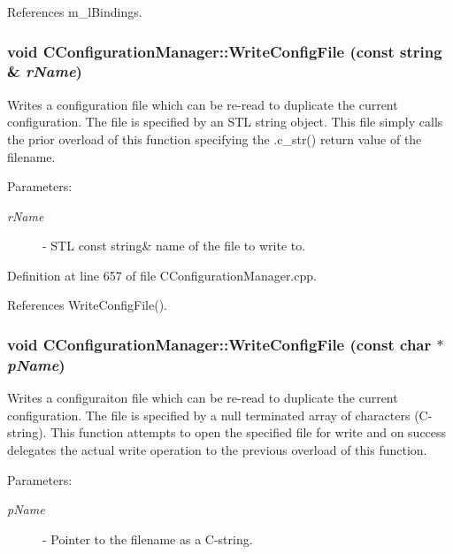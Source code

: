 References m\_\-l\-Bindings.
\subsubsection{\setlength{\rightskip}{0pt plus 5cm}void CConfiguration\-Manager::Write\-Config\-File (const string \& {\em r\-Name})}\label{classCConfigurationManager_a21}


Writes a configuration file which can be re-read to duplicate the current configuration. The file is specified by an STL string object. This file simply calls the prior overload of this function specifying  the .c\_\-str() return value of the filename. \begin{Desc}
\item[Parameters: ]\par
\begin{description}
\item[{\em 
r\-Name}]- STL const string\& name of the file to write to. \end{description}
\end{Desc}


Definition at line 657 of file CConfiguration\-Manager.cpp.

References Write\-Config\-File().
\subsubsection{\setlength{\rightskip}{0pt plus 5cm}void CConfiguration\-Manager::Write\-Config\-File (const char $\ast$ {\em p\-Name})}\label{classCConfigurationManager_a20}


Writes a configuraiton file which can be re-read to duplicate the current configuration. The file is specified by a null terminated array of characters (C-string). This function attempts to open the specified file for write and on success delegates the actual  write operation to the previous overload of this function. \begin{Desc}
\item[Parameters: ]\par
\begin{description}
\item[{\em 
p\-Name}]- Pointer to the filename as a C-string. \end{description}
\end{Desc}


